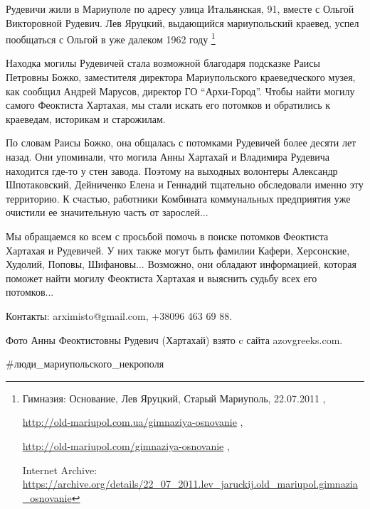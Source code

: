 Рудевичи жили в Мариуполе по адресу улица Итальянская, 91, вместе с Ольгой
Викторовной Рудевич. Лев Яруцкий, выдающийся мариупольский краевед, успел
пообщаться с Ольгой в уже далеком 1962 году%
\footnote{%
Гимназия: Основание, Лев Яруцкий, Старый Мариуполь, 22.07.2011%
, \par\url{http://old-mariupol.com.ua/gimnaziya-osnovanie}%
, \par\url{http://old-mariupol.com/gimnaziya-osnovanie}%
, \par Internet Archive: \url{https://archive.org/details/22_07_2011.lev_jaruckij.old_mariupol.gimnazia_osnovanie}%
}

Находка могилы Рудевичей стала возможной благодаря подсказке Раисы Петровны
Божко, заместителя директора Мариупольского краеведческого музея, как сообщил
Андрей Марусов, директор ГО \enquote{Архи-Город}. Чтобы найти могилу самого Феоктиста
Хартахая, мы стали искать его потомков и обратились к краеведам, историкам и
старожилам. 

По словам Раисы Божко, она общалась с потомками Рудевичей более десяти лет
назад. Они упоминали, что могила Анны Хартахай и Владимира Рудевича находится
где-то у стен завода. Поэтому на выходных волонтеры Александр Шпотаковский,
Дейниченко Елена и Геннадий тщательно обследовали именно эту территорию. К
счастью, работники Комбината коммунальных предприятия уже очистили ее
значительную часть от зарослей...

Мы обращаемся ко всем с просьбой помочь в поиске потомков Феоктиста Хартахая и
Рудевичей. У них также могут быть фамилии Кафери, Херсонские, Худолий, Поповы,
Шифановы... Возможно, они обладают информацией, которая поможет найти могилу
Феоктиста Хартахая и выяснить судьбу всех его потомков...  

Контакты: arximisto@gmail.com, +38096 463 69 88.

Фото Анны Феоктистовны Рудевич (Хартахай) взято c сайта azovgreeks.com.

\#люди\_мариупольского\_некрополя

